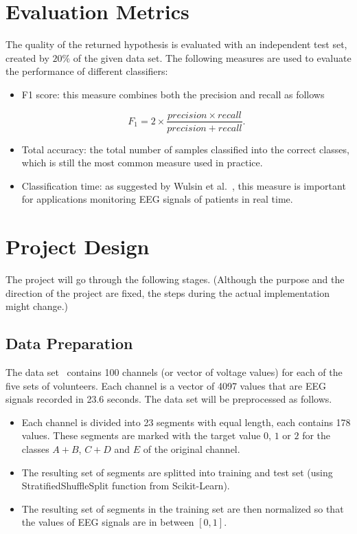 \documentclass[12pt]{article}
\begin{document}
\section{Evaluation Metrics}
\label{sec:metric}
The quality of the returned hypothesis is evaluated with an independent test set, created by $20\%$ of the given data set. The following measures are used to evaluate the performance of different classifiers:
\begin{itemize}
\item F1 score: this measure combines both the precision and recall as follows

\[
F_1 = 2 \times \frac{precision \times recall}{precision + recall}.
\]
\item Total accuracy: the total number of samples classified into the correct classes, which is still the most common measure used in practice.
\item Classification time: as suggested by Wulsin et al.~\cite{wulsin2011modeling}, this measure is important for applications monitoring EEG signals of patients in real time.
\end{itemize}

\section{Project Design}

The project will go through the following stages. (Although the purpose and the direction of the project are fixed, the steps during the actual implementation might change.)

\subsection{Data Preparation}

The data set~\cite{andrzejak2001indications} contains 100 channels (or vector of voltage values) for each of the five sets of volunteers. Each channel is a vector of 4097 values that are EEG signals recorded in 23.6 seconds. The data set will be preprocessed as follows.
\begin{itemize}
\item Each channel is divided into 23 segments with equal length, each contains 178 values. These segments are marked with the target value $0$, $1$ or $2$ for the classes $A + B$, $C + D$ and $E$ of the original channel.
\item The resulting set of segments are splitted into training and test set (using StratifiedShuffleSplit function from Scikit-Learn).
\item The resulting set of segments in the training set are then normalized so that the values of EEG signals are in between $[0,1]$.
\end{itemize}
\end{document}
